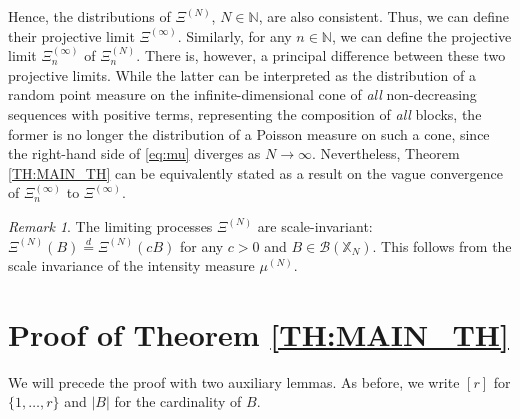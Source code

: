 \documentclass[11pt]{article}
\newcommand{\X}{\mathbb{X}}
\newcommand{\N}{\mathbb{N}}
\newcommand{\1}[1][]{
	\ifx&#1&\mathds{1}
	\else\mathds{1}\left\{#1\right\}\fi}
\newcommand{\deq}{\overset{d}{=}}
\newcommand{\Bc}{\mathcal{B}}
\theoremstyle{definition}
\theoremstyle{remark}
\newtheorem{remark}{Remark}[section]
\numberwithin{equation}{section}
\begin{document}
	Hence, the distributions of $\Xi^{(N)}$, $N\in\N$, are also consistent. Thus, we can define their projective limit $\Xi^{(\infty)}$.
	Similarly, for any $n\in\N$, we can define the projective limit $\Xi_n^{(\infty)}$ of $\Xi_n^{(N)}$.
	There is, however, a principal difference between these two projective limits. While the latter can be interpreted as
	the distribution of a random point measure on the infinite-dimensional cone of \emph{all} non-decreasing sequences
	with positive terms, representing the composition of \emph{all} blocks, the former is no longer the distribution of
	a Poisson measure on such a cone, since the right-hand side of \eqref{eq:mu} diverges as $N\to\infty$.
	Nevertheless, Theorem \ref{TH:MAIN_TH} can be equivalently stated as a result on the vague convergence of $\Xi_n^{(\infty)}$ to $\Xi^{(\infty)}$.
	
	\begin{remark}
		\label{rem:si}
		The limiting processes $\Xi^{(N)}$ are scale-invariant: $\Xi^{(N)}(B)\deq\Xi^{(N)}(cB)$ for any $c>0$ and $B\in\Bc(\X_N)$. This follows from the scale invariance of the intensity measure $\mu^{(N)}$.
	\end{remark}
	
	\section{Proof of Theorem \ref{TH:MAIN_TH}}\label{sec3}
	
	We will precede the proof with two auxiliary lemmas.
	As before, we write $[r]$ for $\{1,\ldots,r\}$ and $|B|$ for the cardinality of $B$.
	
\end{document}
